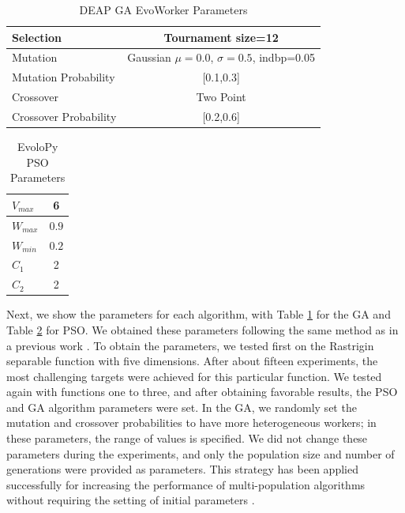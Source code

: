 \documentclass[review]{elsarticle}
\begin{document}
\begin{table}[h!tbp]
  \small
  \caption{DEAP GA EvoWorker Parameters }
  \label{tab:GAparams} 
  \centering
  \small
  \begin{tabular}{|l|c|}
    \hline
    Selection & Tournament size=12                            \\ \hline
    Mutation & Gaussian $\mu=0.0$, $\sigma=0.5$, indbp=0.05   \\ \hline
    Mutation Probability & [0.1,0.3]                          \\ \hline
    Crossover & Two Point                                     \\ \hline
    Crossover Probability  & [0.2,0.6]                          \\ \hline
  \end{tabular}
\end{table}
%
\begin{table}[h!tbp]
  \small
  \caption{ EvoloPy PSO Parameters }
  \label{tab:PSOparams} 
  \centering
  \small
  \begin{tabular}{|l|c|}
    \hline
    $V_{max}$ & 6 \\ \hline
    $W_{max}$ & $0.9$ \\ \hline
    $W_{min}$ & $0.2$ \\ \hline
    $C_1$ & 2 \\ \hline
    $C_2$ & 2 \\ \hline
  \end{tabular}
\end{table}

Next, we show the parameters for each algorithm, with Table \ref{tab:GAparams} for
the GA and Table \ref{tab:PSOparams} for PSO. We obtained these parameters
following the same method as in a previous work \cite{garcia2017benchmarking}.
To obtain the parameters, we tested first on the Rastrigin separable function
with five dimensions. After about fifteen experiments, the most challenging
targets were achieved for this particular function. We tested again with
functions one to three, and after obtaining favorable results, the PSO and GA
algorithm parameters were set. In the GA, we randomly set the mutation and
crossover probabilities to have more heterogeneous workers; 
in these parameters, the range of values is specified. We did not change these parameters during the 
experiments, and only the population size and number of generations were
provided as parameters. This strategy has been applied successfully for increasing 
the performance of multi-population algorithms without requiring the setting 
of initial parameters \cite{garcia2014randomized}.
\end{document}
